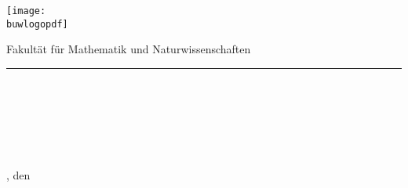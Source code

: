	\begin{titlepage}
		\sffamily%
		\hspace{-1.5em}%
		\texttt{[image: \\buwlogopdf]}%
		\hfill%
		\begin{minipage}[b]{\linewidth-4.5cm}
			\begin{flushright}
				\normalsize{Fakultät für Mathematik und Naturwissenschaften}%
				\vspace*{0.05mm}
			\end{flushright}
		\end{minipage}
		\vspace{-0.3em}
		\begingroup%
			\color{primary}%
			\rule{\textwidth}{3pt}%
		\endgroup%
		
		\vspace{3.2em}
		\begin{center}
			\textbf{\Huge{\artderarbeit}}%
			\vspace{1.4em}
			\\
			\textbf{\large{\thema}}%
		\end{center}
		
		
		\vfill
	
	
		\begin{center}
			\Large
			\autor%
			\\
			{\Large\matrikelnummer}%
			\bigskip\\%
			\studiengang%
			\\
			{\large\schwerpunkt}%
			\vspace{2em}%
			\hspace{0em}\\%
			\normalsize%
			\ort, den \abgabedatum%
		\end{center}
		
		
		\vspace{7.5em}
		
		
		\quad%
		\pbox[t][2em]{\linewidth}{\betreuer}%
		\hfill%
		\quad%
		\pbox[t][2em]{\linewidth}{\prueferA\\\prueferB}%
	
	\end{titlepage}
	\clearpage{\pagestyle{empty}\cleardoublepage}
%
%
